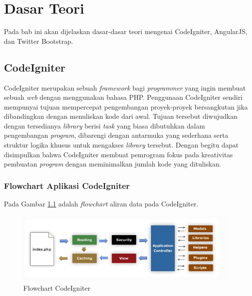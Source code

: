 \chapter{Dasar Teori}
\label{chap: dasarTeori}

Pada bab ini akan dijelaskan dasar-dasar teori mengenai CodeIgniter, AngularJS, dan Twitter Bootstrap.

\section{CodeIgniter}
\label{sec: codeigniter}

CodeIgniter\cite{ciDocs} merupakan sebuah \textit{framework} bagi \textit{programmer} yang ingin membuat sebuah \textit{web} dengan menggunakan bahasa PHP. Penggunaan CodeIgniter sendiri mempunyai tujuan mempercepat pengembangan proyek-proyek bersangkutan jika dibandingkan dengan menuliskan kode dari awal. Tujuan tersebut diwujudkan dengan tersedianya \textit{library} berisi \textit{task} yang biasa dibutuhkan dalam pengembangan \textit{program}, dibarengi dengan antarmuka yang sederhana serta struktur logika khusus untuk mengakses \textit{library} tersebut. Dengan begitu dapat disimpulkan bahwa CodeIgniter membuat pemrogram fokus pada kreativitas pembuatan \textit{program} dengan meminimalkan jumlah kode yang dituliskan.

\subsection{Flowchart Aplikasi CodeIgniter}
\label{sub: FlowAppCI}

Pada Gambar \ref{fig:flowchartCI} adalah \textit{flowchart} aliran data pada CodeIgniter.
\begin{figure}[H]
	\centering
	\includegraphics[scale=0.75]{Gambar/flowChartCI}
	\caption{Flowchart CodeIgniter}
	\label{fig:flowchartCI}
\end{figure}


